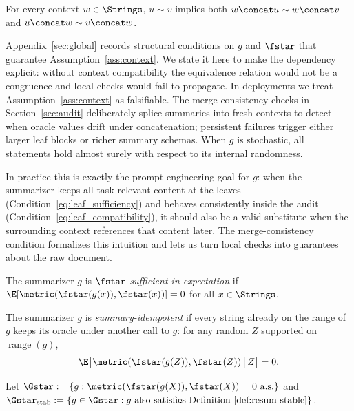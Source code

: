 \begin{assumption}\label{ass:context}
For every context $w\in\Strings$, $u\sim v$ implies both $w\concat u \sim w\concat v$ and $u\concat w\sim v\concat w$.
\end{assumption}

Appendix~\ref{sec:global} records structural conditions on $g$ and $\fstar$ that guarantee Assumption~\ref{ass:context}. We state it here to make the dependency explicit: without context compatibility the equivalence relation would not be a congruence and local checks would fail to propagate. In deployments we treat Assumption~\ref{ass:context} as falsifiable. The merge-consistency checks in Section~\ref{sec:audit} deliberately splice summaries into fresh contexts to detect when oracle values drift under concatenation; persistent failures trigger either larger leaf blocks or richer summary schemas. When $g$ is stochastic, all statements hold almost surely with respect to its internal randomness.

In practice this is exactly the prompt-engineering goal for $g$: when the summarizer keeps all task-relevant content at the leaves (Condition~\eqref{eq:leaf_sufficiency}) and behaves consistently inside the audit (Condition~\eqref{eq:leaf_compatibility}), it should also be a valid substitute when the surrounding context references that content later. The merge-consistency condition formalizes this intuition and lets us turn local checks into guarantees about the raw document.

\begin{definition}\label{def:expect-suff}
The summarizer $g$ is \emph{$\fstar$-sufficient in expectation} if $\E[\metric(\fstar(g(x)),\fstar(x))]=0$ for all $x\in\Strings$.
\end{definition}

\begin{definition}\label{def:resum-stable}
The summarizer $g$ is \emph{summary-idempotent} if every string already on the range of $g$ keeps its oracle under another call to $g$: for any random $Z$ supported on $\operatorname{range}(g)$,
\[
\E\big[\metric(\fstar(g(Z)),\fstar(Z))\,\big|\,Z\big]=0.
\]
\end{definition}

\begin{definition}\label{def:exact-suff-stable}
Let $\Gstar:=\{g:\metric(\fstar(g(X)),\fstar(X))=0\ \text{a.s.}\}$ and $\Gstar_{\mathrm{stab}}:=\{g\in\Gstar:\text{$g$ also satisfies Definition~\ref{def:resum-stable}}\}$.
\end{definition}

